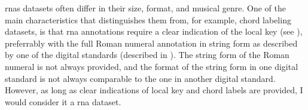 
\glspl{rna} datasets often  differ in their size, format,
and musical genre. One of the main characteristics that
distinguishes them from, for example, chord labeling
datasets, is that \gls{rna} annotations require a clear
indication of the local key (see ),
preferrably with the full Roman numeral annotation in string
form as described by one of the digital standards (described
in ). The string form of the
Roman numeral is not always provided, and the format of the
string form in one digital standard is not always
comparable to the one in another digital standard. However,
as long as clear indications of local key and chord labels
are provided, I would consider it a \gls{rna} dataset.